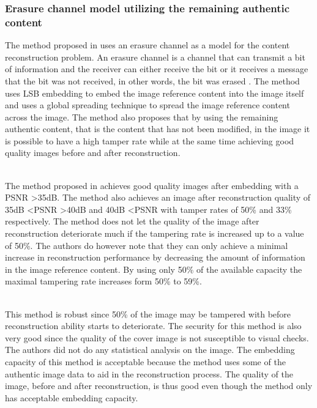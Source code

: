\documentclass[12pt]{article}
\begin{document}
\subsubsection{Erasure channel model utilizing the remaining authentic content}
\label{ErasureChannelOverview}
The method proposed in \cite {korus2013efficient} uses an erasure channel as a model for the content reconstruction problem.
An erasure channel is a channel that can transmit a bit of information and the receiver can either receive the bit or it receives a message that the bit was not received, in other words, the bit was erased \cite{korus2013efficient}.
The method uses LSB embedding to embed the image reference content into the image itself and uses a global spreading technique to spread the image reference content across the image.
The method also proposes that by using the remaining authentic content, that is the content that has not been modified, in the image it is possible to have a high tamper rate while at the same time achieving good quality images before and after reconstruction.

\hspace{0pt} \\
The method proposed in \cite {korus2013efficient} achieves good quality images after embedding with a PSNR \textgreater 35dB. 
The method also achieves an image after reconstruction quality of 35dB \textless PSNR \textgreater 40dB and 40dB \textless PSNR with tamper rates of 50\% and 33\% respectively.
The method does not let the quality of the image after reconstruction deteriorate much if the tampering rate is increased up to a value of 50\%.
The authors do however note that they can only achieve a minimal increase in reconstruction performance by decreasing the amount of information in the image reference content.
By using only 50\% of the available capacity the maximal tampering rate increases form 50\% to 59\%.

\hspace{0pt} \\
This method \cite {korus2013efficient} is robust since 50\% of the image may be tampered with before reconstruction ability starts to deteriorate.
The security for this method is also very good since the quality of the cover image is not susceptible to visual checks.
The authors did not do any statistical analysis on the image.
The embedding capacity of this method is acceptable because the method uses some of the authentic image data to aid in the reconstruction process. The quality of the image, before and after reconstruction, is thus good even though the method only has acceptable embedding capacity.  
\end{document}
